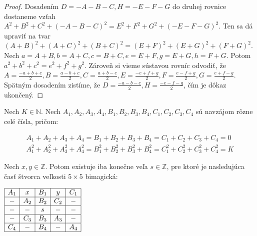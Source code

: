 \begin{proof} Dosadením $D = -A-B-C, H = -E-F-G$ do druhej rovnice dostaneme vzťah $A^2 + B^2 + C^2 + (-A-B-C)^2 = E^2 + F^2 + G^2 + (-E-F-G)^2$. Ten sa dá upraviť na tvar $(A+B)^2 + (A+C)^2 + (B+C)^2 = (E+F)^2 + (E+G)^2 + (F+G)^2$. Nech $a = A+B, b = A+C, c = B+C, e = E+F, g = E+G, h = F+G$. Potom $a^2 + b^2 + c^2 = e^2 + f^2 + g^2$. Zároveň si vieme sústavou rovníc odvodiť, že $A = \frac{-a+b+c}{2}, B = \frac{a-b+c}{2}, C = \frac{a+b-c}{2}, E = \frac{-e+f+g}{2}, F = \frac{e-f+g}{2}, G = \frac{e+f-g}{2}$. Spätným dosadením zistíme, že $D = \frac{-a-b-c}{2}, H = \frac{-e-f-g}{2}$, čím je dôkaz ukončený.
\end{proof}

\begin{theorem}
\label{5x5bimagic3}
Nech $K \in \mathbb{N}$. Nech $A_1, A_2, A_3, A_4, B_1, B_2, B_3, B_4, C_1, C_2, C_3, C_4$ sú navzájom rôzne celé čísla, pričom:

\begin{gather*}
A_1 + A_2 + A_3 + A_4 = B_1 + B_2 + B_3 + B_4 = C_1 + C_2 + C_3 + C_4 = 0 \\
A_1^2 + A_2^2 + A_3^2 + A_4^2 = B_1^2 + B_2^2 + B_3^2 + B_4^2 = C_1^2 + C_2^2 + C_3^2 + C_4^2 = K
\end{gather*}

Nech $x,y \in \mathbb{Z}$. Potom existuje iba konečne veľa $s \in \mathbb{Z}$, pre ktoré je nasledujúca časť štvorca veľkosti $5 \times 5$ bimagická: 

\begin{center}
$\begin{array}{ |c|c|c|c|c| }
\hline
A_1 & x & B_1 & y & C_1 \\ 
\hline
- & A_2 & B_2 & C_2 & -  \\ 
\hline
- & - & s & - & - \\ 
\hline
- & C_3 & B_3 & A_3 & - \\ 
\hline
C_4 & - & B_4 & - & A_4 \\ 
\hline
\end{array}$
\end{center}

\end{theorem}

